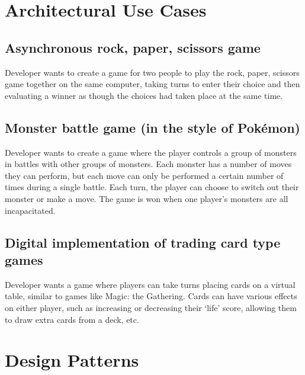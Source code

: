 \documentclass[11pt]{report}
\begin{document}
\section{Architectural Use Cases}
	\subsection{Asynchronous rock, paper, scissors game}
	Developer wants to create a game for two people to play the rock, paper, scissors game together on the same computer, taking turns to enter their choice and then evaluating a winner as though the choices had taken place at the same time. 
	\subsection{Monster battle game (in the style of Pok\'{e}mon\textregistered)}
	Developer wants to create a game where the player controls a group of monsters in battles with other groups of monsters. Each monster has a number of moves they can perform, but each move can only be performed a certain number of times during a single battle. Each turn, the player can choose to switch out their monster or make a move. The game is won when one player’s monsters are all incapacitated.
	\subsection{Digital implementation of trading card type games}
	Developer wants a game where players can take turns placing cards on a virtual table, similar to games like Magic: the Gathering. Cards can have various effects on either player, such as increasing or decreasing their ‘life’ score, allowing them to draw extra cards from a deck, etc.

\section{Design Patterns}
\end{document}
